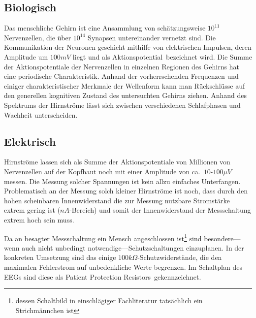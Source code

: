 \documentclass[12pt,a4paper,notitlepage]{article}
\begin{document}
\subsection{Biologisch}
Das menschliche Gehirn ist eine Ansammlung von schätzungsweise $10^{11}$ Nervenzellen, die über $10^{14}$ Synapsen untereinander vernetzt sind. Die Kommunikation der Neuronen geschieht mithilfe von elektrischen Impulsen, deren Amplitude um $100mV$ liegt und als \glqq Aktionspotential\grqq\ bezeichnet wird. Die Summe der Aktionspotentiale der Nervenzellen in einzelnen Regionen des Gehirns hat eine periodische Charakteristik. Anhand der vorherrschenden Frequenzen und einiger charakteristischer Merkmale der Wellenform kann man Rückschlüsse auf den generellen kognitiven Zustand des untersuchten Gehirns ziehen. Anhand des Spektrums der Hirnströme lässt sich zwischen verschiedenen Schlafphasen und Wachheit unterscheiden\cite{WP14,WP15,WP16,WP17,WP18,WP19}.
\subsection{Elektrisch}
Hirnströme lassen sich als Summe der Aktionspotentiale von Millionen von Nervenzellen auf der Kopfhaut noch mit einer Amplitude von ca.\ $10$-$100\mu V$ messen\cite{MAYER1}. Die Messung solcher Spannungen ist kein allzu einfaches Unterfangen. Problematisch an der Messung solch kleiner Hirnströme ist noch, dass durch den hohen scheinbaren Innenwiderstand die zur Messung nutzbare Stromstärke extrem gering ist ($nA$-Bereich) und somit der Innenwiderstand der Messschaltung extrem hoch sein muss.

Da an besagter Messschaltung ein Mensch angeschlossen ist\footnote{dessen Schaltbild in einschlägiger Fachliteratur tatsächlich ein Strichmännchen ist} sind besondere---wenn auch nicht unbedingt notwendige---Schutzschaltungen einzuplanen. In der konkreten Umsetzung sind das einige $100k\Omega$-Schutzwiderstände, die den maximalen \gls{Fehlerstrom} auf unbedenkliche Werte begrenzen. Im Schaltplan des EEGs sind diese als \glqq Patient Protection Resistors\grqq\ gekennzeichnet.
\end{document}
